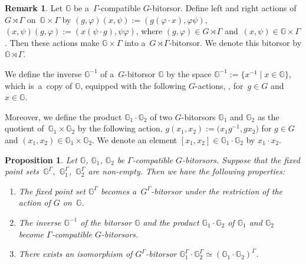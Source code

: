 \documentclass[10pt,a4paper]{amsart}
\numberwithin{equation}{section}
\newtheorem{Proposition}[Theorem]{Proposition}
\theoremstyle{definition}
\newtheorem{Remark}[Theorem]{Remark}
\newcommand{\bG}{\mathbb{G}}
\begin{document}
\begin{Remark}\label{compati_bitorsor_and_semi_product}
 Let $\bG$ be a~$\Gamma$-compatible $G$-bitorsor.
 Define left and right actions of~$G \rtimes \Gamma$ on~$\bG \times \Gamma$ by $(g,\varphi)(x,\psi) := (g(\varphi \cdot x), \varphi \psi)$, $(x, \psi)(g,\varphi) := (x(\psi \cdot g), \psi \varphi)$,
 where $(g,\varphi)\in G \rtimes \Gamma$ and~${(x, \psi) \in \bG \times \Gamma}$.
 Then these actions make $\bG \times \Gamma$ into a~$G \rtimes \Gamma$-bitorsor.
 We denote this bitorsor by $\bG \rtimes \Gamma$.
\end{Remark}

We define the inverse $\bG^{-1}$ of a~$G$-bitorsor $\bG$ by the space $\bG^{-1} := \bigl\{x^{-1}\mid x \in \bG\big\}$, which is~a~copy of $\bG$, equipped with the following $G$-actions,
, 
for~${g \in G}$ and $x \in \bG$.

Moreover, we define the product $\bG_1\cdot \bG_2$ of two $G$-bitorsors $\bG_1$ and $\bG_2$ as the quotient of~$\bG_1 \times \bG_2$ by the following action,
$g (x_1,x_2) := \bigl(x_1 g^{-1}, g x_2\bigr)$
for $g \in G$ and $(x_1,x_2) \in \bG_1 \times \bG_2$.
We denote an element $[x_1,x_2] \in \bG_1 \cdot \bG_2$ by $x_1 \cdot x_2$.

\begin{Proposition}
Let $\bG$, $\bG_1$, $\bG_2$ be $\Gamma$-compatible $G$-bitorsors. Suppose that the fixed point sets~$\bG^{\Gamma}$,~$\bG_1^{\Gamma}$,~$\bG_2^{\Gamma}$ are non-empty.
Then we have the following properties:
\begin{enumerate}\itemsep=0pt
 \item [$(1)$] The fixed point set $\bG^{\Gamma}$ becomes a~$G^{\Gamma}$-bitorsor under the restriction of the action of $G$ on~$\bG$.
 \item [$(2)$] The inverse $\bG^{-1}$ of the bitorsor $\bG$ and the product $\bG_1 \cdot \bG_2$ of $\bG_1$ and $\bG_2$ become $\Gamma$-compatible $G$-bitorsors.
 \item [$(3)$] There exists an isomorphism of $G^{\Gamma}$-bitorsor $\bG_1^{\Gamma}\cdot \bG_2^{\Gamma} \simeq (\bG_1 \cdot \bG_2)^{\Gamma}$.
\end{enumerate}
\end{Proposition}
\end{document}
